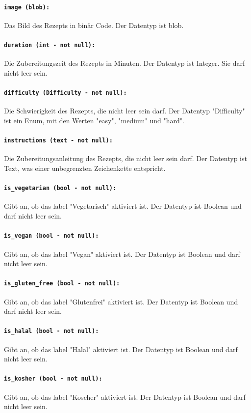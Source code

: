 \documentclass{entwurfsheft}
\begin{document}
\begin{sloppypar}
\paragraph{\texttt{image (blob):}} Das Bild des Rezepts in binär Code. Der Datentyp ist \Gls{blob}.
\paragraph{\texttt{duration (int - not null):}} Die Zubereitungszeit des Rezepts in Minuten. Der Datentyp ist Integer. Sie darf nicht leer sein.
\paragraph{\texttt{difficulty (Difficulty - not null):}} Die Schwierigkeit des Rezepts, die nicht leer sein darf. Der Datentyp "Difficulty" ist ein Enum, mit den Werten "easy", "medium" und "hard".
\paragraph{\texttt{instructions (text - not null):}} Die Zubereitungsanleitung des Rezepts, die nicht leer sein darf. Der Datentyp ist Text, was einer unbegrenzten Zeichenkette entspricht.
\paragraph{\texttt{is\_vegetarian (bool - not null):}} Gibt an, ob das \Gls{label} "Vegetarisch" aktiviert ist. Der Datentyp ist Boolean und darf nicht leer sein.
\paragraph{\texttt{is\_vegan (bool - not null):}} Gibt an, ob das \Gls{label} "Vegan" aktiviert ist. Der Datentyp ist Boolean und darf nicht leer sein.
\paragraph{\texttt{is\_gluten\_free (bool - not null):}} Gibt an, ob das \Gls{label} "Glutenfrei" aktiviert ist. Der Datentyp ist Boolean und darf nicht leer sein.
\paragraph{\texttt{is\_halal (bool - not null):}} Gibt an, ob das \Gls{label} "Halal" aktiviert ist. Der Datentyp ist Boolean und darf nicht leer sein.
\paragraph{\texttt{is\_kosher (bool - not null):}} Gibt an, ob das \Gls{label} "Koscher" aktiviert ist. Der Datentyp ist Boolean und darf nicht leer sein.

\end{sloppypar}
\end{document}
